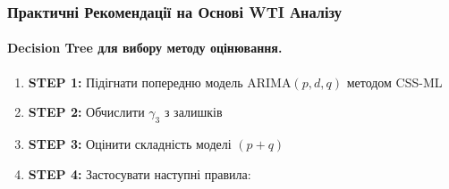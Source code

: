 \documentclass[12pt,a4paper]{article}
\begin{document}
\subsubsection{Практичні Рекомендації на Основі WTI Аналізу}
\label{subsubsec:wti_practical_recommendations}

\paragraph{Decision Tree для вибору методу оцінювання.}

\begin{enumerate}
    \item \textbf{STEP 1:} Підігнати попередню модель ARIMA$(p,d,q)$ методом CSS-ML
    \item \textbf{STEP 2:} Обчислити $\gamma_3$ з залишків
    \item \textbf{STEP 3:} Оцінити складність моделі $(p+q)$
    \item \textbf{STEP 4:} Застосувати наступні правила:
\end{enumerate}
\end{document}
